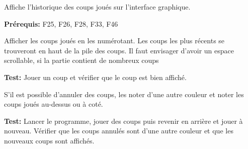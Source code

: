 \documentclass{article}
\begin{document}
\begin{needbox}
    Affiche l'historique des coups joués sur l'interface graphique.

    \textbf{Prérequis:} F25, F26, F28, F33, F46
    \begin{subneedbox}
        Afficher les coups joués en les numérotant. Les coups les plus récents se trouveront
        en haut de la pile des coups. Il faut envisager d'avoir un espace scrollable, si la partie
        contient de nombreux coups

        \textbf{Test:} Jouer un coup et vérifier que le coup est bien affiché.
    \end{subneedbox}
    \begin{subneedbox}
        S'il est possible d'annuler des coups, les noter d'une autre couleur et noter les 
        coups joués au-dessus ou à coté.

        \textbf{Test:} Lancer le programme, jouer des coups puis revenir en arrière et jouer à nouveau.
        Vérifier que les coups annulés sont d'une autre couleur et que les nouveaux coups sont affichés.
    \end{subneedbox}
\end{needbox}
\end{document}
